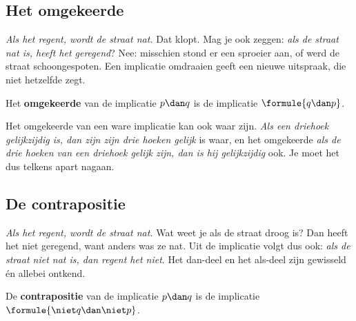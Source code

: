 \begin{oefeningen}
\end{oefeningen}

\subsection{Het omgekeerde}

\textit{Als het regent, wordt de straat nat.} Dat klopt. Mag je ook zeggen: \textit{als de straat nat is, heeft het geregend}? Nee: misschien stond er een sproeier aan, of werd de straat schoongespoten. Een implicatie omdraaien geeft een nieuwe uitspraak, die niet hetzelfde zegt.

\begin{theorie}
Het \textbf{\textcolor{accent}{omgekeerde}} van de implicatie $p \dan q$ is de implicatie $\formule{q \dan p}$.
\end{theorie}


Het omgekeerde van een ware implicatie kan ook waar zijn. \textit{Als een driehoek gelijkzijdig is, dan zijn zijn drie hoeken gelijk} is waar, en het omgekeerde \textit{als de drie hoeken van een driehoek gelijk zijn, dan is hij gelijkzijdig} ook. Je moet het dus telkens apart nagaan.

\begin{oefeningen}
\end{oefeningen}

\subsection{De contrapositie}

\textit{Als het regent, wordt de straat nat.} Wat weet je als de straat droog is? Dan heeft het niet geregend, want anders was ze nat. Uit de implicatie volgt dus ook: \textit{als de straat niet nat is, dan regent het niet}. Het dan-deel en het als-deel zijn gewisseld én allebei ontkend.

\begin{theorie}
De \textbf{\textcolor{accent}{contrapositie}} van de implicatie $p \dan q$ is de implicatie $\formule{\niet q \dan \niet p}$.
\end{theorie}

